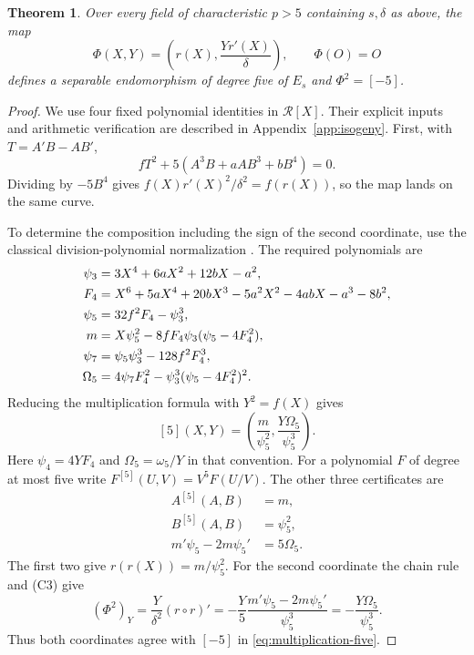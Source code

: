 \documentclass[11pt,a4paper]{article}
\newtheorem{theorem}{Theorem}[section]
\theoremstyle{remark}
\begin{document}
\begin{theorem}\label{thm:isogeny}
Over every field of characteristic $p>5$ containing $s,\delta$ as
above, the map
\begin{equation}\label{eq:isogeny}
 \Phi(X,Y)=\left(r(X),\frac{Yr'(X)}{\delta}\right),
 \qquad \Phi(O)=O
\end{equation}
defines a separable endomorphism of degree five of $E_s$ and
$\Phi^2=[-5]$.
\end{theorem}
\begin{proof}
We use four fixed polynomial identities in $\mathcal R[X]$.
Their explicit inputs and arithmetic verification are described in
Appendix~\ref{app:isogeny}. First, with $T=A'B-AB'$,
\begin{equation*}\label{eq:C0}
 fT^2+5(A^3B+aAB^3+bB^4)=0.\tag{C0}
\end{equation*}
Dividing by $-5B^4$ gives $f(X)r'(X)^2/\delta^2=f(r(X))$,
so the map lands on the same curve.

To determine the composition including the sign of the second
coordinate, use the classical division-polynomial normalization
\cite[\S\S5.5--5.6]{suth5}. The required polynomials are
\begin{align}\label{eq:division-polynomials}
 \psi_3&=3X^4+6aX^2+12bX-a^2,\notag\\
 F_4&=X^6+5aX^4+20bX^3-5a^2X^2-4abX-a^3-8b^2,\notag\\
 \psi_5&=32f^2F_4-\psi_3^3,\notag\\
 m&=X\psi_5^2-8fF_4\psi_3(\psi_5-4F_4^2),\\
 \psi_7&=\psi_5\psi_3^3-128f^2F_4^3,\notag\\
 \Omega_5&=4\psi_7F_4^2-\psi_3^3(\psi_5-4F_4^2)^2.\notag
\end{align}
Reducing the multiplication formula with $Y^2=f(X)$ gives
\begin{equation}\label{eq:multiplication-five}
 [5](X,Y)=\left(\frac m{\psi_5^2},
                         \frac{Y\Omega_5}{\psi_5^3}\right).
\end{equation}
Here $\psi_4=4YF_4$ and $\Omega_5=\omega_5/Y$ in that convention.
For a polynomial $F$ of degree at most five write
$F^{[5]}(U,V)=V^5F(U/V)$. The other three certificates are
\begin{align}
 A^{[5]}(A,B)&=m,\tag{C1}\label{eq:C1}\\
 B^{[5]}(A,B)&=\psi_5^2,\tag{C2}\label{eq:C2}\\
 m'\psi_5-2m\psi_5'&=5\Omega_5.\tag{C3}\label{eq:C3}
\end{align}
The first two give $r(r(X))=m/\psi_5^2$.
For the second coordinate the chain rule and (C3) give
\[
 (\Phi^2)_Y=\frac{Y}{\delta^2}(r\circ r)'
 =-\frac{Y}{5}\frac{m'\psi_5-2m\psi_5'}{\psi_5^3}
 =-\frac{Y\Omega_5}{\psi_5^3}.
\]
Thus both coordinates agree with $[-5]$ in
\eqref{eq:multiplication-five}.


\end{proof}
\end{document}
